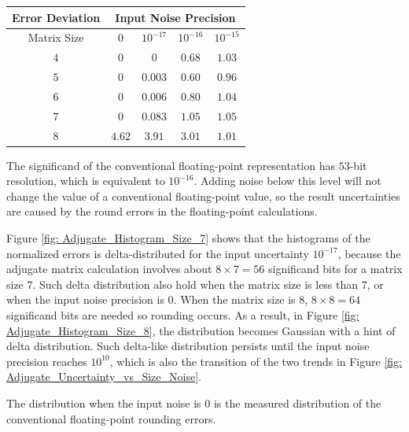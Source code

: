 \documentclass[twoside]{article}
\numberwithin{equation}{section}
\begin{document}
\begin{table}
\centering
\begin{tabular}{|c|c|c|c|c|} 
\hline 
Error Deviation & \multicolumn{4}{|c|}{Input Noise Precision}  \\ 
\hline 
Matrix Size & $0$ & $10^{-17}$ & $10^{-16}$ & $10^{-15}$ \\ 
\hline 
$4$ & $0$     &       $0$ & $0.68$ & $1.03$ \\
\hline 
$5$ & $0$     & $0.003$ & $0.60$ & $0.96$ \\
\hline 
$6$ & $0$     & $0.006$ & $0.80$ & $1.04$ \\
\hline 
$7$ & $0$     & $0.083$ & $1.05$ & $1.05$ \\
\hline 
$8$ & $4.62$ & $3.91$  & $3.01$ & $1.01$ \\
\hline 
\end{tabular}
\label{tbl: matrix rounding errors}
\end{table}


The significand of the conventional floating-point representation \cite{Floating_Point_Standard} has $53$-bit resolution, which is equivalent to $10^{-16}$.
Adding noise below this level will not change the value of a conventional floating-point value, so the result uncertainties are caused by the round errors in the floating-point calculations.

Figure \ref{fig: Adjugate_Histogram_Size_7} shows that the histograms of the normalized errors is delta-distributed for the input uncertainty $10^{-17}$, because the adjugate matrix calculation involves about $8 \times 7 = 56$ significand bits for a matrix size $7$.
Such delta distribution also hold when the matrix size is less than $7$, or when the input noise precision is $0$.
When the matrix size is $8$, $8 \times 8 = 64$ significand bits are needed so rounding occurs.
As a result, in Figure \ref{fig: Adjugate_Histogram_Size_8}, the distribution becomes Gaussian with a hint of delta distribution.
Such delta-like distribution persists until the input noise precision reaches $10^{10}$, which is also the transition of the two trends in Figure \ref{fig: Adjugate_Uncertainty_vs_Size_Noise}.

The distribution when the input noise is $0$ is the measured distribution of the conventional floating-point rounding errors.
\end{document}
